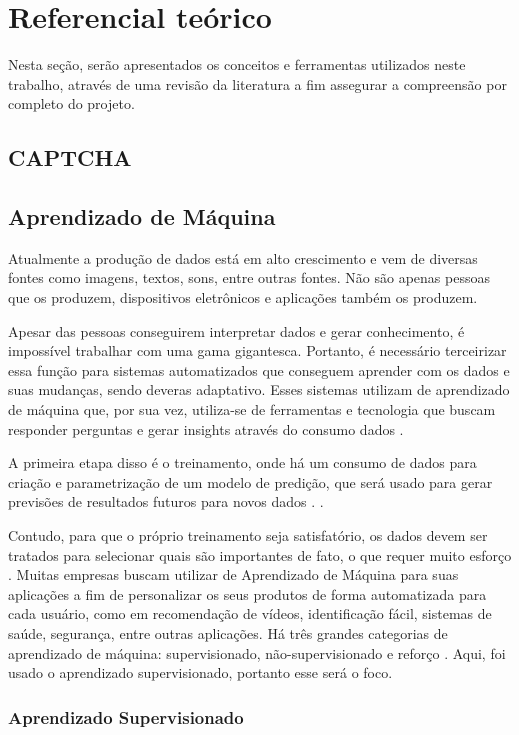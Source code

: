\section{Referencial teórico}
Nesta seção, serão apresentados os conceitos e ferramentas utilizados neste trabalho, através de uma revisão da literatura a fim assegurar a compreensão por completo do projeto. 

\subsection{CAPTCHA}

\subsection{Aprendizado de Máquina}
Atualmente a produção de dados está em alto crescimento e vem de diversas fontes como imagens, textos, sons, entre outras fontes. Não são apenas pessoas que os produzem, dispositivos eletrônicos e aplicações também os produzem. 

Apesar das pessoas conseguirem interpretar dados e gerar conhecimento, é impossível trabalhar com uma gama gigantesca. Portanto, é necessário terceirizar essa função para sistemas automatizados que conseguem aprender com os dados e suas mudanças, sendo deveras adaptativo.
Esses sistemas utilizam de aprendizado de máquina que, por sua vez, utiliza-se de ferramentas e tecnologia que buscam responder perguntas e
gerar insights através do consumo dados \cite{santos2018identificaccao}.

A primeira etapa disso é o treinamento, onde há um consumo de dados para criação e parametrização de um modelo de predição, que será usado para gerar previsões de resultados futuros para novos dados \cite{russell2002artificial}. .  

Contudo, para que o próprio treinamento seja satisfatório, os dados devem ser tratados para selecionar quais são importantes de fato, o que requer muito esforço \cite{russell2002artificial}.
Muitas empresas buscam utilizar de Aprendizado de Máquina para suas aplicações a fim de personalizar os seus produtos de forma automatizada para cada usuário, como em recomendação de vídeos, identificação fácil, sistemas de saúde, segurança, entre outras aplicações. Há três grandes categorias de aprendizado de máquina: supervisionado, não-supervisionado e reforço \cite{russell2002artificial}. Aqui, foi usado o aprendizado supervisionado, portanto esse será o foco.
\subsubsection{Aprendizado Supervisionado}

